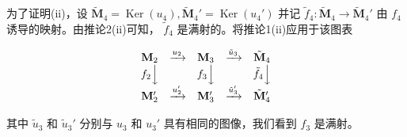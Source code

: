 为了证明(ii)，设 \(\tilde{\mathbf{M}}_{4} = \operatorname{Ker}(u_{4}), \tilde{\mathbf{M}}_{4}' = \operatorname{Ker}(u_{4}')\) 并记 \(\tilde{f}_{4}: \tilde{\mathbf{M}}_{4} \to \tilde{\mathbf{M}}_{4}'\) 由 \(f_{4}\) 诱导的映射。由推论2(ii)可知， \(\tilde{f}_{4}\) 是满射的。将推论1(ii)应用于该图表

\[
\begin{array}{c c c c c} \mathbf {M} _ {2} & \xrightarrow {u _ {2}} & \mathbf {M} _ {3} & \xrightarrow {\tilde {u} _ {3}} & \tilde {\mathbf {M}} _ {4} \\ f _ {2} \Big \downarrow & & f _ {3} \Big \downarrow & & \tilde {f} _ {4} \Big \downarrow \\ \mathbf {M} _ {2} ^ {\prime} & \xrightarrow {u _ {2} ^ {\prime}} & \mathbf {M} _ {3} ^ {\prime} & \xrightarrow {\tilde {u} _ {3} ^ {\prime}} & \tilde {\mathbf {M}} _ {4} ^ {\prime} \end{array}
\]

其中 \(\tilde{u}_3\) 和 \(\tilde{u}_3'\) 分别与 \(u_3\) 和 \(u_3'\) 具有相同的图像，我们看到 \(f_3\) 是满射。

